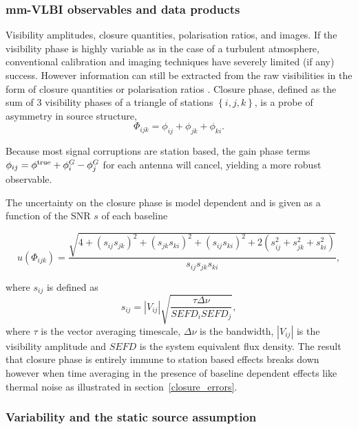 \subsubsection{mm-VLBI observables and data products}
Visibility amplitudes, closure quantities, polarisation ratios, and images.
If the visibility phase is highly variable as in the case of a turbulent atmosphere,  conventional calibration and imaging techniques have severely limited (if any) success. However information can still be extracted from the raw visibilities in the form of closure quantities \citep{Monnier_2007} or polarisation ratios \citep{Fish_2009}. Closure phase, defined as the sum of 3 visibility phases of a triangle of stations $\left\{i,j,k\right\}$, is a probe of asymmetry in source structure,
\begin{equation}
\Phi_{ijk} = \phi_{ij}+\phi_{jk}+\phi_{ki}.
\end{equation}

\noindent Because most signal corruptions are station based, the gain phase terms $\phi_{ij}=\phi^{\rm true}+ \phi^G_i -\phi^G_j$ for each antenna will cancel, yielding a more robust observable. 

The uncertainty on the closure phase is model dependent \citep{Rogers_1995} and is given as a function of the SNR $s$ of each baseline 

\begin{equation}\label{eq:ucp}
u(\Phi_{ijk}) = \frac{\sqrt{4 + (s_{ij}s_{jk})^2 + (s_{jk}s_{ki})^2 + (s_{ij}s_{ki})^2 +
                        2(s_{ij}^2+s_{jk}^2+s_{ki}^2)}}{s_{ij}s_{jk}s_{ki}},
\end{equation}

\noindent where $s_{ij}$ is defined as
\begin{equation}
s_{ij}=|V_{ij}| \sqrt{\frac{ \tau \Delta \nu}{SEFD_i SEFD_j}},
\end{equation}
where $\tau$ is the vector averaging timescale, $\Delta \nu$ is the bandwidth, $|V_{ij}|$ is the visibility amplitude and $SEFD$ is the system equivalent flux density. The result that closure phase is entirely immune to station based effects breaks down however when time averaging in the presence of baseline dependent effects like thermal noise as illustrated in section~\ref{closure_errors}.
 
 \subsubsection{Variability and the static source assumption}


